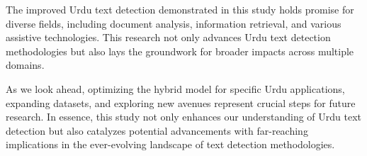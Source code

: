 \documentclass[default,iicol]{sn-jnl} %
\begin{document}
The improved Urdu text detection demonstrated in this study holds promise for diverse fields, including document analysis, information retrieval, and various assistive technologies. This research not only advances Urdu text detection methodologies but also lays the groundwork for broader impacts across multiple domains.

As we look ahead, optimizing the hybrid model for specific Urdu applications, expanding datasets, and exploring new avenues represent crucial steps for future research. In essence, this study not only enhances our understanding of Urdu text detection but also catalyzes potential advancements with far-reaching implications in the ever-evolving landscape of text detection methodologies.
\backmatter



%

\end{document}
